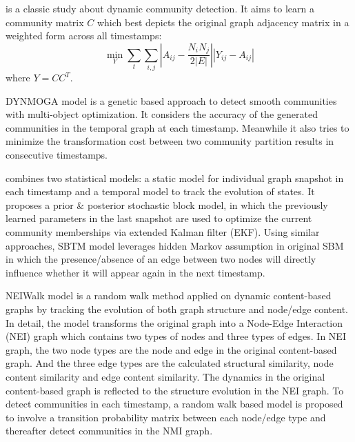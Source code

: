\cite{chen2013detecting} is a classic study about dynamic community detection. It aims to learn a community matrix $C$ which best depicts the original graph adjacency matrix in a weighted form across all timestamps:
\begin{equation}
	\min_{Y}\sum_t \sum_{i,j}|A_{ij}-\frac{N_i N_j}{2|E|}||Y_{ij}-A_{ij}|
\end{equation}
where $Y=CC^T$.

DYNMOGA model \cite{folino2013evolutionary} is a genetic based approach to detect smooth communities with multi-object optimization. It considers the accuracy of the generated communities in the temporal graph at each timestamp. Meanwhile it also tries to minimize the transformation cost between two community partition results in consecutive timestamps. 

\cite{xu2014dynamic} combines two statistical models: a static model for individual graph snapshot in each timestamp and a temporal model to track the evolution of states. It proposes a prior \& posterior stochastic block model, in which the previously learned parameters in the last snapshot are used to optimize the current community memberships via  extended Kalman filter (EKF). Using similar approaches, SBTM model \cite{xu2015stochastic} leverages hidden Markov assumption in original SBM in which the presence/absence of an edge between two nodes will directly influence whether it will appear again in the next timestamp. 

NEIWalk model \cite{wang2013neiwalk} is a random walk method applied on dynamic content-based graphs by tracking the evolution of both graph structure and node/edge content.  In detail, the model transforms the original graph into a Node-Edge Interaction (NEI) graph which contains two types of nodes and three types of edges. In NEI graph, the two node types are the node and edge in the original content-based graph. And the three edge types are the calculated structural similarity, node content similarity and edge content similarity. The dynamics in the original content-based graph is reflected to the structure evolution in the NEI graph. To detect communities in each timestamp, a random walk based model is proposed to involve a transition probability matrix between each node/edge type and thereafter detect communities in the NMI graph. 

